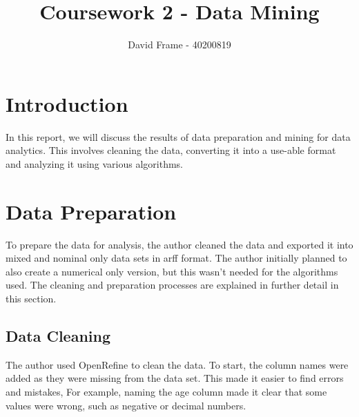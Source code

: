 \documentclass[runningheads, 12pt]{llncs}
\begin{document}
%
\title{Coursework 2 - Data Mining}
%
%
\author{David Frame - 40200819}
%
%
%
\maketitle              %
%
\section{Introduction}
In this report, we will discuss the results of data preparation and mining for data analytics. This involves cleaning the data, converting it into a use-able format and analyzing it using various algorithms.



%
\section{Data Preparation}

To prepare the data for analysis, the author cleaned the data and exported it into mixed and nominal only data sets in arff format. The author initially planned to also create a numerical only version, but this wasn't needed for the algorithms used. The cleaning and preparation processes are explained in further detail in this section.

\subsection{Data Cleaning}

The author used OpenRefine to clean the data. To start, the column names were added as they were missing from the data set. This made it easier to find errors and mistakes, For example, naming the age column made it clear that some values were wrong, such as negative or decimal numbers.
\end{document}
